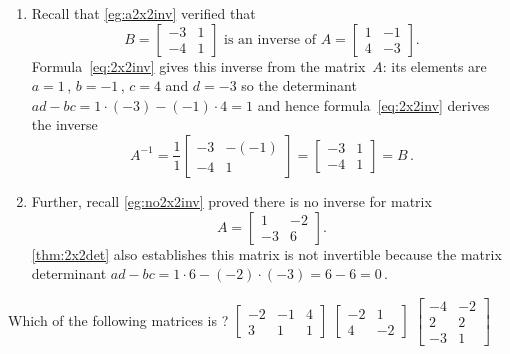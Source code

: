\begin{example} 
\begin{enumerate}
\item Recall that \cref{eg:a2x2inv} verified that
\begin{equation*}
B=\begin{bmatrix} -3&1\\-4&1 \end{bmatrix}
\text{ is an inverse of }
A=\begin{bmatrix} 1&-1\\4&-3 \end{bmatrix}.
\end{equation*}
Formula~\eqref{eq:2x2inv} gives this inverse from the matrix~\(A\): its elements are \(a=1\)\,, \(b=-1\)\,, \(c=4\) and \(d=-3\) so the determinant \(ad-bc=1\cdot(-3)-(-1)\cdot4=1\) and hence formula~\eqref{eq:2x2inv} derives the inverse
\begin{equation*}
A^{-1}=\frac11\begin{bmatrix} -3&-(-1)\\-4&1 \end{bmatrix}
=\begin{bmatrix} -3&1\\-4&1 \end{bmatrix}=B\,.
\end{equation*}

\item Further, recall \cref{eg:no2x2inv} proved there is no inverse for matrix
\begin{equation*}
A=\begin{bmatrix} 1&-2\\-3&6 \end{bmatrix}.
\end{equation*}
\cref{thm:2x2det} also establishes this matrix is not invertible because the matrix determinant \(ad-bc=1\cdot6-(-2)\cdot(-3)=6-6=0\)\,. 
\end{enumerate}
\end{example}




\begin{activity}
Which of the following matrices is ?
{\(\begin{bmatrix} -2&-1&4\\3&1&1 \end{bmatrix}\)}
{\(\begin{bmatrix} -2&1\\4&-2 \end{bmatrix}\)}
{\(\begin{bmatrix} -4&-2\\2&2\\-3&1 \end{bmatrix}\)}
\end{activity}



